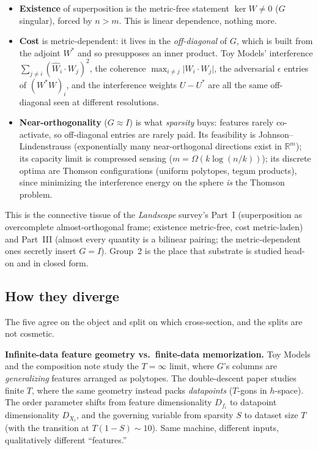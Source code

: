 \begin{itemize}[leftmargin=1.4em]
\item \textbf{Existence} of superposition is the metric-free statement $\ker W \ne 0$ ($G$ singular), forced by $n > m$. This is linear dependence, nothing more.
\item \textbf{Cost} is metric-dependent: it lives in the \emph{off-diagonal} of $G$, which is built from the adjoint $W^{*}$ and so presupposes an inner product. Toy Models' interference $\sum_{j\ne i}(\hat W_i\cdot W_j)^2$, the coherence $\max_{i\ne j}\lvert W_i\cdot W_j\rvert$, the adversarial $\epsilon$ entries of $(W^{*}W)_i$, and the interference weights $U - U^{*}$ are all the same off-diagonal seen at different resolutions.
\item \textbf{Near-orthogonality} ($G\approx I$) is what \emph{sparsity} buys: features rarely co-activate, so off-diagonal entries are rarely paid. Its feasibility is Johnson--Lindenstrauss (exponentially many near-orthogonal directions exist in $\mathbb{R}^m$); its capacity limit is compressed sensing ($m = \Omega(k\log(n/k))$); its discrete optima are Thomson configurations (uniform polytopes, tegum products), since minimizing the interference energy on the sphere \emph{is} the Thomson problem.
\end{itemize}

This is the connective tissue of the \emph{Landscape} survey's Part~I (superposition as overcomplete almost-orthogonal frame; existence metric-free, cost metric-laden) and Part~III (almost every quantity is a bilinear pairing; the metric-dependent ones secretly insert $G=I$). Group~2 is the place that substrate is studied head-on and in closed form.


\subsection*{How they diverge}

The five agree on the object and split on which cross-section, and the splits are not cosmetic.

\textbf{Infinite-data feature geometry vs.\ finite-data memorization.} Toy Models and the composition note study the $T=\infty$ limit, where $G$'s columns are \emph{generalizing} features arranged as polytopes. The double-descent paper studies finite $T$, where the same geometry instead packs \emph{datapoints} ($T$-gons in $h$-space). The order parameter shifts from feature dimensionality $D_{f_i}$ to datapoint dimensionality $D_{X_i}$, and the governing variable from sparsity $S$ to dataset size $T$ (with the transition at $T(1-S)\sim 10$). Same machine, different inputs, qualitatively different ``features.''

